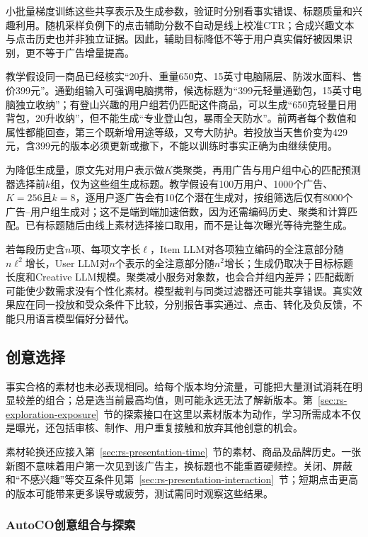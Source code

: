 小批量梯度训练这些共享表示及生成参数，验证时分别看事实错误、标题质量和兴趣利用。随机采样负例下的点击辅助分数不自动是线上校准CTR；合成兴趣文本与点击历史也并非独立证据。因此，辅助目标降低不等于用户真实偏好被因果识别，更不等于广告增量提高。

教学假设同一商品已经核实“20升、重量650克、15英寸电脑隔层、防泼水面料、售价399元”。通勤组输入可强调电脑携带，候选标题为“399元轻量通勤包，15英寸电脑独立收纳”；有登山兴趣的用户组若仍匹配这件商品，可以生成“650克轻量日用背包，20升收纳”，但不能生成“专业登山包，暴雨全天防水”。前两者每个数值和属性都能回查，第三个既新增用途等级，又夸大防护。若投放当天售价变为429元，含399元的版本必须更新或撤下，不能以训练时事实正确为由继续使用。

为降低生成量，原文先对用户表示做$K$类聚类，再用广告与用户组中心的匹配预测器选择前$k$组，仅为这些组生成标题。教学假设有100万用户、1000个广告、$K=256$且$k=8$，逐用户逐广告会有10亿个潜在生成对，按组筛选后仅有8000个广告--用户组生成对；这不是端到端加速倍数，因为还需编码历史、聚类和计算匹配。已有标题随后由线上素材选择接口取用，而不是让每次曝光等待完整生成。

若每段历史含$n$项、每项文字长$\ell$，Item LLM对各项独立编码的全注意部分随$n\ell^2$增长，User LLM对$n$个表示的全注意部分随$n^2$增长；生成仍取决于目标标题长度和Creative LLM规模。聚类减小服务对象数，也会合并组内差异；匹配截断可能使少数需求没有个性化素材。模型裁判与同类过滤器还可能共享错误。真实效果应在同一投放和受众条件下比较，分别报告事实通过、点击、转化及负反馈，不能只用语言模型偏好分替代。

\subsection{创意选择}
\label{sec:rs-advertising-creative-selection}

事实合格的素材也未必表现相同。给每个版本均分流量，可能把大量测试消耗在明显较差的组合；总是选当前最高均值，则可能永远无法了解新版本。第~\ref{sec:rs-exploration-exposure}~节的探索接口在这里以素材版本为动作，学习所需成本不仅是曝光，还包括审核、制作、用户重复接触和放弃其他创意的机会。

素材轮换还应接入第~\ref{sec:rs-presentation-time}~节的素材、商品及品牌历史。一张新图不意味着用户第一次见到该广告主，换标题也不能重置硬频控。关闭、屏蔽和“不感兴趣”等交互条件见第~\ref{sec:rs-presentation-interaction}~节；短期点击更高的版本可能带来更多误导或疲劳，测试需同时观察这些结果。

\subsubsection{AutoCO创意组合与探索}
\label{sec:rs-advertising-autoco}

